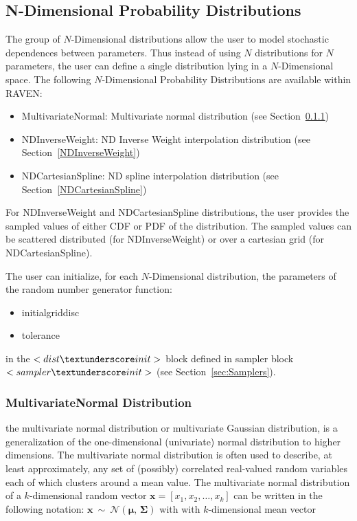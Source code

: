 \subsection{N-Dimensional Probability Distributions}
\label{subsec:NdDist}
The group of $N$-Dimensional distributions allow the user to model stochastic dependences between parameters. Thus instead of using $N$ distributions for $N$ parameters, the user can define a single distribution lying in a $N$-Dimensional space.
The following $N$-Dimensional Probability Distributions are available within RAVEN:
\begin{itemize}
\item MultivariateNormal: Multivariate normal distribution (see Section~\ref{MultivariateNormal})
\item NDInverseWeight: ND Inverse Weight interpolation distribution (see Section~\ref{NDInverseWeight})
\item NDCartesianSpline: ND spline interpolation distribution (see Section~\ref{NDCartesianSpline})
\end{itemize}
For NDInverseWeight and NDCartesianSpline distributions, the user provides the sampled values of either CDF or PDF of the distribution. The sampled values can be scattered distributed (for NDInverseWeight) or over a cartesian grid (for NDCartesianSpline).

The user can initialize, for each $N$-Dimensional distribution, the parameters of the random number generator function:
\begin{itemize}
\item initial\textunderscore grid\textunderscore disc
\item tolerance
\end{itemize}
in the $<dist\textunderscore init>$ block defined in sampler block $<sampler\textunderscore init>$ (see Section~\ref{sec:Samplers}).

\subsubsection{MultivariateNormal Distribution}
\label{MultivariateNormal}
the multivariate normal distribution or multivariate Gaussian distribution, is a generalization of the one-dimensional (univariate) normal distribution to higher dimensions.
The multivariate normal distribution is often used to describe, at least approximately, any set of (possibly) correlated real-valued random variables each of which clusters around a mean value.
The multivariate normal distribution of a $k$-dimensional random vector $\mathbf{x} = [x_1, x_2, …, x_k]$  can be written in the following notation:
$ \mathbf{x}\ \sim\ \mathcal{N}(\boldsymbol\mu,\, \boldsymbol\Sigma)$
with with $k$-dimensional mean vector

